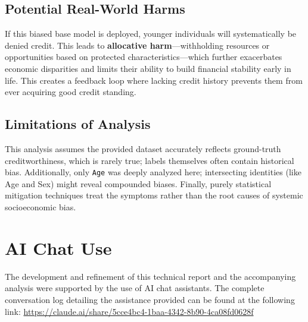 \documentclass[12pt,a4paper]{article}
\begin{document}
\subsection*{Potential Real-World Harms}
If this biased base model is deployed, younger individuals will systematically be denied credit. This leads to \textbf{allocative harm}---withholding resources or opportunities based on protected characteristics---which further exacerbates economic disparities and limits their ability to build financial stability early in life. This creates a feedback loop where lacking credit history prevents them from ever acquiring good credit standing.

\subsection*{Limitations of Analysis}
This analysis assumes the provided dataset accurately reflects ground-truth creditworthiness, which is rarely true; labels themselves often contain historical bias. Additionally, only \texttt{Age} was deeply analyzed here; intersecting identities (like Age and Sex) might reveal compounded biases. Finally, purely statistical mitigation techniques treat the symptoms rather than the root causes of systemic socioeconomic bias.

\section{AI Chat Use}
The development and refinement of this technical report and the accompanying analysis were supported by the use of AI chat assistants. The complete conversation log detailing the assistance provided can be found at the following link: \url{https://claude.ai/share/5cce4bc4-1baa-4342-8b90-4ca08fd0628f}
\end{document}
